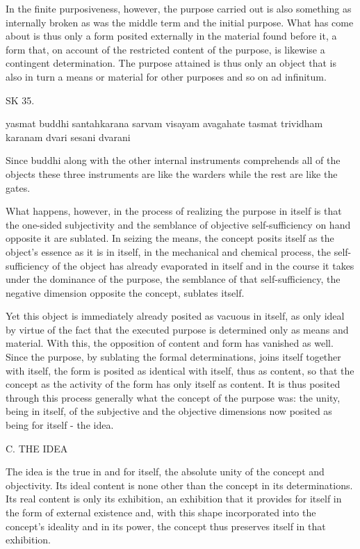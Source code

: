 In the finite purposiveness, however, the purpose carried out is also
something as internally broken as was the middle term and the initial purpose.
What has come about is thus only a form posited externally in the material
found before it, a form that, on account of the restricted content of
the purpose, is likewise a contingent determination.
The purpose attained is thus only an object that is also
in turn a means or material for other purposes and so on ad infinitum.

SK 35.

yasmat buddhi santahkarana sarvam visayam avagahate
tasmat trividham karanam dvari sesani dvarani

Since buddhi along with the other internal instruments
comprehends all of the objects these three instruments are
like the warders while the rest are like the gates.

What happens, however, in the process of realizing
the purpose in itself is that the one-sided subjectivity and
the semblance of objective self-sufficiency on hand opposite it are sublated.
In seizing the means, the concept posits itself as the object's essence as
it is in itself, in the mechanical and chemical process,
the self-sufficiency of the object has already evaporated in itself and
in the course it takes under the dominance of the purpose,
the semblance of that self-sufficiency,
the negative dimension opposite the concept, sublates itself.

Yet this object is immediately already posited as vacuous in itself,
as only ideal by virtue of the fact that the executed purpose is
determined only as means and material.
With this, the opposition of content and form has vanished as well.
Since the purpose, by sublating the formal determinations,
joins itself together with itself,
the form is posited as identical with itself, thus as content,
so that the concept as the activity of the form has only itself as content.
It is thus posited through this process generally what the concept of the purpose was:
the unity, being in itself, of the subjective and the objective dimensions
now posited as being for itself - the idea.

C. THE IDEA

The idea is the true in and for itself,
the absolute unity of the concept and objectivity.
Its ideal content is none other than the concept in its determinations.
Its real content is only its exhibition, an exhibition
that it provides for itself in the form of external existence and,
with this shape incorporated into the concept's ideality and in its power,
the concept thus preserves itself in that exhibition.

